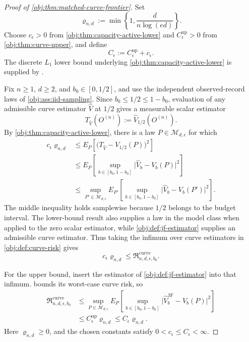\begin{proof}[Proof of \cref{obj:thm:matched-curve-frontier}]
Set
\[
\varrho_{n,d}:=\min\left\{1,\frac{d}{n\log(ed)}\right\}.
\]
Choose \(c_\epsilon>0\) from \cref{obj:thm:capacity-active-lower} and \(C_\epsilon^{\mathrm{up}}>0\) from \cref{obj:thm:curve-upper}, and define
\[
C_\epsilon:=C_\epsilon^{\mathrm{up}}+c_\epsilon.
\]
The discrete \(L_1\) lower bound underlying \cref{obj:thm:capacity-active-lower} is supplied by \citep[Theorem 3 and the unknown-both-distributions reduction following Theorem 6]{JiaoHanWeissman2018}.

Fix \(n\ge1\), \(d\ge2\), and \(b_0\in[0,1/2]\), and use the independent observed-record laws of \cref{obj:ass:iid-sampling}. Since \(b_0\le1/2\le1-b_0\), evaluation of any admissible curve estimator \(\widehat V\) at \(1/2\) gives a measurable scalar estimator
\[
T_{\widehat V}(O^{(n)}):=\widehat V_{1/2}(O^{(n)}).
\]
By \cref{obj:thm:capacity-active-lower}, there is a law \(P\in\mathcal M_{d,\epsilon}\) for which
\[
\begin{aligned}
c_\epsilon\varrho_{n,d}
&\le E_P\!\left[\bigl(T_{\widehat V}-V_{1/2}(P)\bigr)^2\right]\\
&\le E_P\!\left[\sup_{b\in[b_0,1-b_0]}
       \bigl|\widehat V_b-V_b(P)\bigr|^2\right]\\
&\le \sup_{P'\in\mathcal M_{d,\epsilon}}
 E_{P'}\!\left[\sup_{b\in[b_0,1-b_0]}
       \bigl|\widehat V_b-V_b(P')\bigr|^2\right].
\end{aligned}
\]
The middle inequality holds samplewise because \(1/2\) belongs to the budget interval. The lower-bound result also supplies a law in the model class when applied to the zero scalar estimator, while \cref{obj:def:jf-estimator} supplies an admissible curve estimator. Thus taking the infimum over curve estimators in \cref{obj:def:curve-risk} gives
\[
c_\epsilon\varrho_{n,d}
\le \mathfrak R_{n,d,\epsilon,b_0}^{\mathrm{curve}}.
\]

For the upper bound, insert the estimator of \cref{obj:def:jf-estimator} into that infimum.  bounds its worst-case curve risk, so
\[
\begin{aligned}
\mathfrak R_{n,d,\epsilon,b_0}^{\mathrm{curve}}
&\le \sup_{P\in\mathcal M_{d,\epsilon}}
 E_P\!\left[\sup_{b\in[b_0,1-b_0]}
 \bigl|\widehat V_b^{\mathrm{JF}}-V_b(P)\bigr|^2\right]\\
&\le C_\epsilon^{\mathrm{up}}\varrho_{n,d}
 \le C_\epsilon\varrho_{n,d}.
\end{aligned}
\]
Here \(\varrho_{n,d}\ge0\), and the chosen constants satisfy \(0<c_\epsilon\le C_\epsilon<\infty\).


\end{proof}
